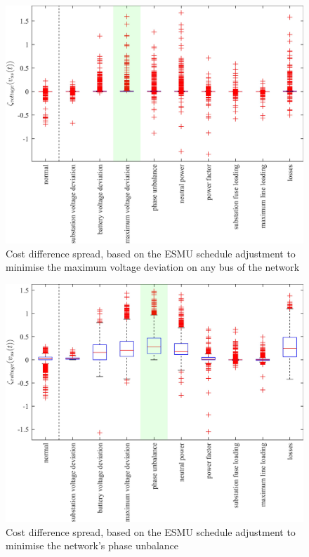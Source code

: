 \begin{figure}\centering
	\includegraphics{_chapter1/fig/appendix/minimising-maximum-voltage-deviation}
	\caption{Cost difference spread, based on the ESMU schedule adjustment to minimise the maximum voltage deviation on any bus of the network}
\end{figure}

\begin{figure}\centering
	\includegraphics{_chapter1/fig/appendix/minimising-phase-unbalance}
	\caption{Cost difference spread, based on the ESMU schedule adjustment to minimise the network's phase unbalance}
\end{figure}

